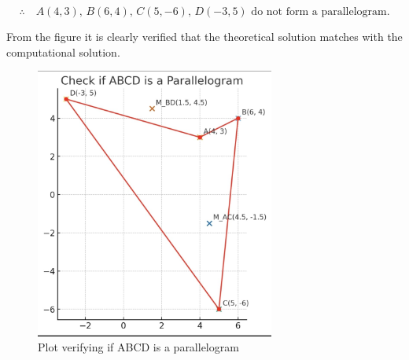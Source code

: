\documentclass[journal]{IEEEtran}
\begin{document}
\[
\therefore \quad A(4,3),\, B(6,4),\, C(5,-6),\, D(-3,5) \text{ do not form a parallelogram.}
\]

From the figure it is clearly verified that the theoretical solution matches with the computational solution.

\begin{figure}[H]
    \centering
    \includegraphics[width=0.7\textwidth]{figs/1_2_15.jpg}
    \caption{Plot verifying if ABCD is a parallelogram}
    \label{fig:parallelogram}
\end{figure}
\end{document}
